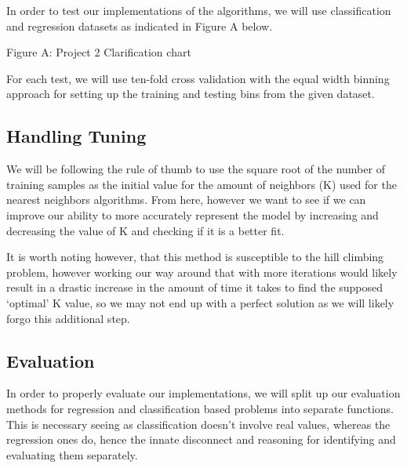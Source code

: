 \documentclass{article}
\begin{document}
\quad \quad In order to test our implementations of the algorithms, we will use classification and regression datasets as indicated in Figure A below. 

\begin{center}
    \caption{Figure A: Project 2 Clarification chart}
\end{center}

\quad For each test, we will use ten-fold cross validation with the equal width binning approach for setting up the training and testing bins from the given dataset.

\subsection*{Handling Tuning}

\quad \quad We will be following the rule of thumb to use the square root of the number of training samples as the initial value for the amount of neighbors (K) used for the nearest neighbors algorithms. From here, however we want to see if we can improve our ability to more accurately represent the model by increasing and decreasing the value of K and checking if it is a better fit.

It is worth noting however, that this method is susceptible to the hill climbing problem, however working our way around that with more iterations would likely result in a drastic increase in the amount of time it takes to find the supposed ‘optimal’ K value, so we may not end up with a perfect solution as we will likely forgo this additional step.

\subsection*{Evaluation}

\quad \quad In order to properly evaluate our implementations, we will split up our evaluation methods for regression and classification based problems into separate functions. This is necessary seeing as classification doesn't involve real values, whereas the regression ones do, hence the innate disconnect and reasoning for identifying and evaluating them separately.
\end{document}
